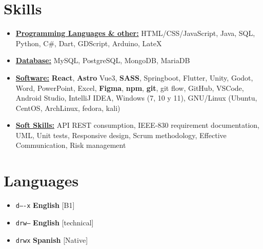 \documentclass[11pt,a4paper,sans]{moderncv}
\newcommand{\sectionMargin}{-3mm}
\begin{document}
\section{Skills}{
\begin{itemize}[label=\textbullet, noitemsep]
\item {\underline{\textbf{Programming Languages \& other:}} 
    {HTML/CSS/JavaScript},
    {Java},
    {SQL},
    {Python},
    {C\#},
    {Dart},
    {GDScript},
    {Arduino},
    {LateX}
}
\item {\underline{\textbf{Database:}}
    {MySQL},
    {PostgreSQL},
    {MongoDB},
    {MariaDB}
}
\item {\underline{\textbf{Software:}}
    \textbf{React},
    \textbf{Astro}
    {Vue3},
    \textbf{SASS},
    {Springboot},
    {Flutter},
    {Unity},
    {Godot},
    {Word},
    {PowerPoint},
    {Excel}, 
    \textbf{Figma},
    \textbf{npm},
    \textbf{git},
    {git flow},
    {GitHub},
    {VSCode},
    {Android Studio},
    {IntelliJ IDEA},
    {Windows} (7, 10 y 11),
    {GNU/Linux} (Ubuntu, CentOS, ArchLinux, fedora, kali)
}
\item {\underline{\textbf{Soft Skills:}}
    {API REST} consumption,
    {IEEE-830} requirement documentation,
    {UML},
    {Unit tests},
    {Responsive design},
    {Scrum} methodology,
    Effective Communication, 
    {Risk management}
}
\end{itemize}}

\vspace*{\sectionMargin}

\section{Languages} 
\begin{itemize}[label=\textbullet, noitemsep]
    \item \texttt{d----x}   \textbf{English} [B1]
    \item \texttt{drw--}    \textbf{English} [technical]
    \item \texttt{drwx}     \textbf{Spanish} [Native]
\end{itemize}
\end{document}

